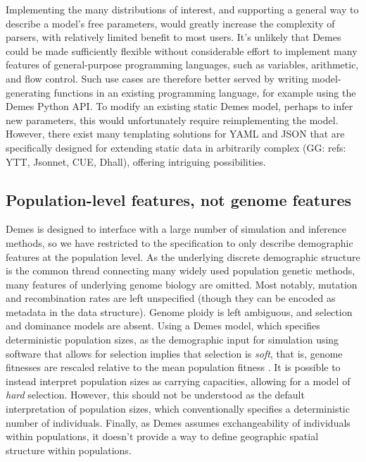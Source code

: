 \documentclass[11pt]{article}
\newcommand{\ggcomment}[1]{{\textcolor{yellow!60!red}{GG: #1}}}
\begin{document}
Implementing the many distributions of interest, and supporting a general
way to describe a model's free parameters, would greatly increase the
complexity of parsers, with relatively limited benefit to most users.
It's unlikely that Demes could be made sufficiently
flexible without considerable effort to implement many features of
general-purpose programming languages, such as variables, arithmetic,
and flow control.
Such use cases are therefore better served by writing model-generating
functions in an existing programming language, for example
using the Demes Python API.
To modify an existing static Demes model, perhaps to infer new parameters,
this would unfortunately require reimplementing the model.
However, there exist many templating solutions for YAML and JSON that are
specifically designed for extending static data in arbitrarily complex
(\ggcomment{refs: YTT, Jsonnet, CUE, Dhall}),
offering intriguing possibilities.


\subsection{Population-level features, not genome features}
\label{sec:appendix-features}

Demes is designed to interface with a large number of simulation and inference
methods, so we have restricted to the specification to only describe
demographic features at the population level. As the underlying discrete
demographic structure is the common thread connecting many widely used
population genetic methods, many features of underlying genome biology are
omitted. Most notably, mutation and recombination rates are left unspecified
(though they can be encoded as metadata in the data structure). Genome ploidy
is left ambiguous, and selection and dominance models are absent. Using a Demes
model, which specifies deterministic population sizes, as the demographic input
for simulation using software that allows for selection implies that selection
is \emph{soft}, that is, genome fitnesses are rescaled relative to the mean
population fitness \citep{christiansen1975hard}. It is possible to instead
interpret population sizes as carrying capacities, allowing for a model of
\emph{hard} selection. However, this should not be understood as the default
interpretation of population sizes, which conventionally specifies a
deterministic number of individuals. Finally, as Demes assumes exchangeability
of individuals within populations, it doesn't provide a way to define geographic
spatial structure within populations.
\end{document}
